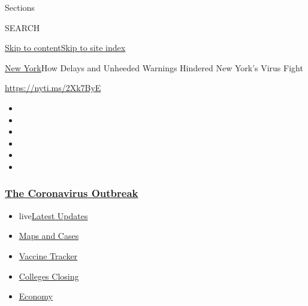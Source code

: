 Sections

SEARCH

\protect\hyperlink{site-content}{Skip to
content}\protect\hyperlink{site-index}{Skip to site index}

\href{/section/nyregion}{New York}\textbar{}How Delays and Unheeded
Warnings Hindered New York's Virus Fight

\url{https://nyti.ms/2Xk7ByE}

\begin{itemize}
\item
\item
\item
\item
\item
\item
\end{itemize}

\hypertarget{the-coronavirus-outbreak}{%
\subsubsection{\texorpdfstring{\href{https://www.nytimes3xbfgragh.onion/news-event/coronavirus?name=styln-coronavirus-national\&region=TOP_BANNER\&variant=undefined\&block=storyline_menu_recirc\&action=click\&pgtype=Article\&impression_id=05e7ce30-e3a8-11ea-ab24-c151c34c6c9f}{The
Coronavirus
Outbreak}}{The Coronavirus Outbreak}}\label{the-coronavirus-outbreak}}

\begin{itemize}
\tightlist
\item
  live\href{https://www.nytimes3xbfgragh.onion/2020/08/21/world/covid-19-coronavirus.html?name=styln-coronavirus-national\&region=TOP_BANNER\&variant=undefined\&block=storyline_menu_recirc\&action=click\&pgtype=Article\&impression_id=05e7ce31-e3a8-11ea-ab24-c151c34c6c9f}{Latest
  Updates}
\item
  \href{https://www.nytimes3xbfgragh.onion/interactive/2020/us/coronavirus-us-cases.html?name=styln-coronavirus-national\&region=TOP_BANNER\&variant=undefined\&block=storyline_menu_recirc\&action=click\&pgtype=Article\&impression_id=05e7ce32-e3a8-11ea-ab24-c151c34c6c9f}{Maps
  and Cases}
\item
  \href{https://www.nytimes3xbfgragh.onion/interactive/2020/science/coronavirus-vaccine-tracker.html?name=styln-coronavirus-national\&region=TOP_BANNER\&variant=undefined\&block=storyline_menu_recirc\&action=click\&pgtype=Article\&impression_id=05e7ce33-e3a8-11ea-ab24-c151c34c6c9f}{Vaccine
  Tracker}
\item
  \href{https://www.nytimes3xbfgragh.onion/2020/08/19/us/colleges-closing-covid.html?name=styln-coronavirus-national\&region=TOP_BANNER\&variant=undefined\&block=storyline_menu_recirc\&action=click\&pgtype=Article\&impression_id=05e7f540-e3a8-11ea-ab24-c151c34c6c9f}{Colleges
  Closing}
\item
  \href{https://www.nytimes3xbfgragh.onion/live/2020/08/20/business/stock-market-today-coronavirus?name=styln-coronavirus-national\&region=TOP_BANNER\&variant=undefined\&block=storyline_menu_recirc\&action=click\&pgtype=Article\&impression_id=05e7f541-e3a8-11ea-ab24-c151c34c6c9f}{Economy}
\end{itemize}

